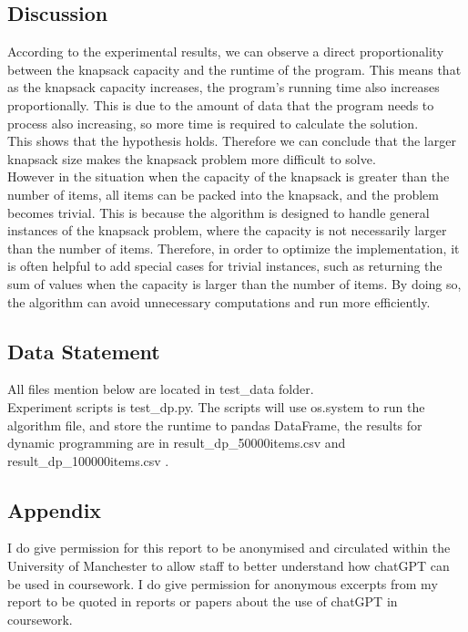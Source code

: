 \documentclass[a4]{article}
\begin{document}
\subsection{Discussion}

According to the experimental results, we can observe a direct proportionality between the knapsack capacity and the runtime of the program. This means that as the knapsack capacity increases, the program's running time also increases proportionally. This is due to the amount of data that the program needs to process also increasing, so more time is required to calculate the solution.\\

\noindent This shows that the hypothesis holds. Therefore we can conclude that the larger knapsack size makes the knapsack problem more difficult to solve.\\

\noindent However in the situation when the capacity of the knapsack is greater than the number of items, all items can be packed into the knapsack, and the problem becomes trivial. This is because the algorithm is designed to handle general instances of the knapsack problem, where the capacity is not necessarily larger than the number of items. Therefore, in order to optimize the implementation, it is often helpful to add special cases for trivial instances, such as returning the sum of values when the capacity is larger than the number of items. By doing so, the algorithm can avoid unnecessary computations and run more efficiently. \\

\subsection{Data Statement}
All files mention below are located in test\_data folder.\\

\noindent Experiment scripts is test\_dp.py. The scripts will use os.system to run the algorithm file, and store the runtime to pandas DataFrame, the results for dynamic programming are in result\_dp\_50000items.csv and result\_dp\_100000items.csv .\\

\subsection{Appendix}

I do give permission for this report to be anonymised and circulated within the University of Manchester to allow staff to better understand how chatGPT can be used in coursework.  I do give permission for anonymous excerpts from my report to be quoted in reports or papers about the use of chatGPT in coursework.

\end{document}
